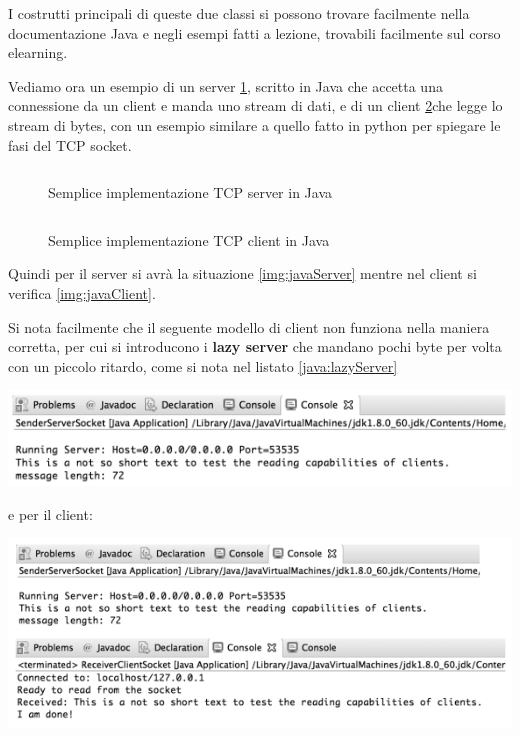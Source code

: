 \message{ !name(sd.tex)}\documentclass[a4paper,12pt, oneside]{book}
\begin{document}
I costrutti principali di queste due classi si possono trovare facilmente nella documentazione Java 
e negli esempi fatti a lezione, trovabili facilmente sul corso elearning.

Vediamo ora un esempio di un server \ref{java:tcpServer}, scritto in Java che accetta una connessione da un client 
e manda uno stream di dati, e di un client \ref{java:tcpClient}che legge lo stream di bytes, 
con un esempio similare a quello fatto in python per spiegare le fasi del TCP socket.

\begin{figure}
    \caption{Semplice implementazione TCP server in Java}
    \label{java:tcpServer}
    \inputminted{java}{code/javaSocket/ServerWriter/SenderServerSocket.java}
\end{figure}

\begin{figure}
    \caption{Semplice implementazione TCP client in Java}
    \label{java:tcpClient}
    \inputminted{java}{code/javaSocket/ServerWriter/ReceiverClientSocket.java}
\end{figure}

Quindi per il server si avrà la situazione \ref{img:javaServer} mentre nel client 
si verifica \ref{img:javaClient}.

Si nota facilmente che il seguente modello di client non funziona nella maniera corretta, per cui
si introducono i \textbf{lazy server} che mandano pochi byte per volta con un piccolo ritardo,
come si nota nel listato \ref{java:lazyServer}

\begin{center}
	\includegraphics[scale=2.5]{img/sc5.png}
\end{center}
e per il client:
\begin{center}
	\includegraphics[scale=2.5]{img/sc6.png}
\end{center}
\end{document}
